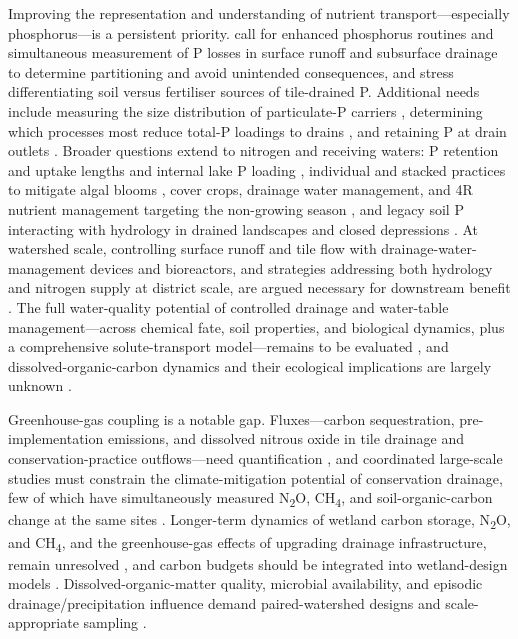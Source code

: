 \documentclass[11pt]{article}
\begin{document}
Improving the representation and understanding of nutrient transport---especially
phosphorus---is a persistent priority. \textcite{King2015} call for enhanced
phosphorus routines and simultaneous measurement of P losses in surface runoff and
subsurface drainage to determine partitioning and avoid unintended consequences,
and \textcite{Williams2016} stress differentiating soil versus fertiliser sources
of tile-drained P. Additional needs include measuring the size distribution of
particulate-P carriers \parencite{Qi2018}, determining which processes most reduce
total-P loadings to drains \parencite{Geohring2001}, and retaining P at drain
outlets \parencite{Zimmer2016}. Broader questions extend to nitrogen and
receiving waters: P retention and uptake lengths and internal lake P loading
\parencite{Clement2017}, individual and stacked practices to mitigate algal blooms
\parencite{King2018}, cover crops, drainage water management, and 4R nutrient
management targeting the non-growing season
\parencite{King2016,Kokulan2021}, and legacy soil P interacting with hydrology in
drained landscapes and closed depressions
\parencite{Mumbi2024,Mumbi2025b,Hanrahan2020}. At watershed scale, controlling
surface runoff and tile flow with drainage-water-management devices and
bioreactors, and strategies addressing both hydrology and nitrogen supply at
district scale, are argued necessary for downstream benefit
\parencite{Li2015,Ikenberry2014,Filipovic2015,BinShokrana2023,Koskiaho2002,Kladivko2005}.
The full water-quality potential of controlled drainage and water-table
management---across chemical fate, soil properties, and biological dynamics, plus a
comprehensive solute-transport model---remains to be evaluated
\parencite{FAUSEY1995,RITTER1995}, and dissolved-organic-carbon dynamics and their
ecological implications are largely unknown \parencite{Ruark2009,Furukawa2008}.

Greenhouse-gas coupling is a notable gap. Fluxes---carbon sequestration,
pre-implementation emissions, and dissolved nitrous oxide in tile drainage and
conservation-practice outflows---need quantification \parencite{Mitchell2023}, and
coordinated large-scale studies must constrain the climate-mitigation potential of
conservation drainage, few of which have simultaneously measured N\textsubscript{2}O,
CH\textsubscript{4}, and soil-organic-carbon change at the same sites
\parencite{Hall2025}. Longer-term dynamics of wetland carbon storage,
N\textsubscript{2}O, and CH\textsubscript{4}, and the greenhouse-gas effects of
upgrading drainage infrastructure, remain unresolved \parencite{Mitchell2022}, and
carbon budgets should be integrated into wetland-design models \parencite{Kadlec2012}.
Dissolved-organic-matter quality, microbial availability, and episodic
drainage/precipitation influence demand paired-watershed designs and
scale-appropriate sampling \parencite{Dalzell2011,Bellmore2015}.
\end{document}

